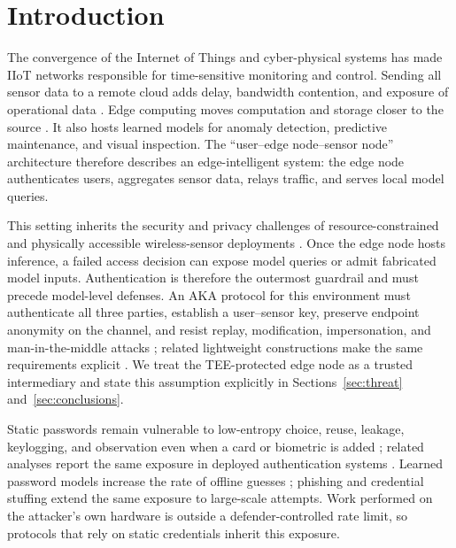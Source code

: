 \documentclass[cmc,article,submit,moreauthors,pdftex]{Definitions/tsp}
\begin{document}
\section{Introduction}

The convergence of the Internet of Things and cyber-physical systems has made IIoT networks responsible for time-sensitive monitoring and control. Sending all sensor data to a remote cloud adds delay, bandwidth contention, and exposure of operational data \cite{shi}. Edge computing moves computation and storage closer to the source \cite{ranaweera}. It also hosts learned models for anomaly detection, predictive maintenance, and visual inspection. The ``user--edge node--sensor node'' architecture therefore describes an edge-intelligent system: the edge node authenticates users, aggregates sensor data, relays traffic, and serves local model queries.

This setting inherits the security and privacy challenges of resource-constrained and physically accessible wireless-sensor deployments \cite{jabbari,wu2017privacy}. Once the edge node hosts inference, a failed access decision can expose model queries or admit fabricated model inputs. Authentication is therefore the outermost guardrail and must precede model-level defenses. An AKA protocol for this environment must authenticate all three parties, establish a user--sensor key, preserve endpoint anonymity on the channel, and resist replay, modification, impersonation, and man-in-the-middle attacks \cite{wang2021revisit,singh}; related lightweight constructions make the same requirements explicit \cite{shuai,rangwani}. We treat the TEE-protected edge node as a trusted intermediary and state this assumption explicitly in Sections~\ref{sec:threat} and~\ref{sec:conclusions}.

Static passwords remain vulnerable to low-entropy choice, reuse, leakage, keylogging, and observation even when a card or biometric is added \cite{basharzad,liu2019robust,shakirov}; related analyses report the same exposure in deployed authentication systems \cite{khalid}. Learned password models increase the rate of offline guesses \cite{hitaj2019passgan,xu2023passbert}; phishing and credential stuffing extend the same exposure to large-scale attempts. Work performed on the attacker's own hardware is outside a defender-controlled rate limit, so protocols that rely on static credentials inherit this exposure.
\end{document}
